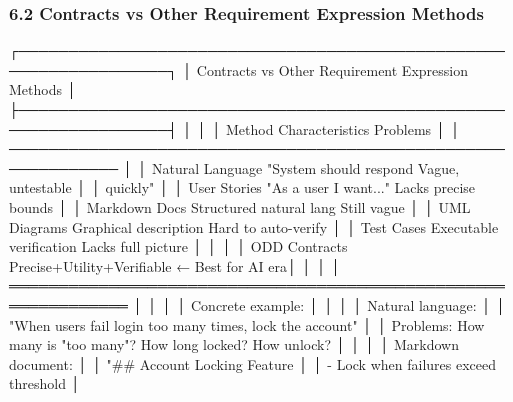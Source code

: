 \documentclass[
]{article}
\newenvironment{Shaded}{}{}
\newcommand{\NormalTok}[1]{#1}
\begin{document}
\hypertarget{62-contracts-vs-other-requirement-expression-methods}{%
\subsubsection{6.2 Contracts vs Other Requirement Expression
Methods}\label{62-contracts-vs-other-requirement-expression-methods}}

\begin{Shaded}
\begin{Highlighting}[]
\NormalTok{┌─────────────────────────────────────────────────────────────────┐}
\NormalTok{│        Contracts vs Other Requirement Expression Methods         │}
\NormalTok{├─────────────────────────────────────────────────────────────────┤}
\NormalTok{│                                                                  │}
\NormalTok{│  Method            Characteristics        Problems              │}
\NormalTok{│  ─────────────────────────────────────────────────────────────  │}
\NormalTok{│  Natural Language  "System should respond  Vague, untestable   │}
\NormalTok{│                    quickly"                                     │}
\NormalTok{│  User Stories      "As a user I want..."  Lacks precise bounds │}
\NormalTok{│  Markdown Docs     Structured natural lang Still vague          │}
\NormalTok{│  UML Diagrams      Graphical description  Hard to auto{-}verify  │}
\NormalTok{│  Test Cases        Executable verification Lacks full picture  │}
\NormalTok{│                                                                  │}
\NormalTok{│  ODD Contracts     Precise+Utility+Verifiable ← Best for AI era│}
\NormalTok{│                                                                  │}
\NormalTok{│  ══════════════════════════════════════════════════════════════  │}
\NormalTok{│                                                                  │}
\NormalTok{│  Concrete example:                                              │}
\NormalTok{│                                                                  │}
\NormalTok{│  Natural language:                                              │}
\NormalTok{│  "When users fail login too many times, lock the account"       │}
\NormalTok{│  Problems: How many is "too many"? How long locked? How unlock? │}
\NormalTok{│                                                                  │}
\NormalTok{│  Markdown document:                                             │}
\NormalTok{│  "\#\# Account Locking Feature                                    │}
\NormalTok{│   {-} Lock when failures exceed threshold                         │}

\end{Highlighting}
\end{Shaded}
\end{document}
